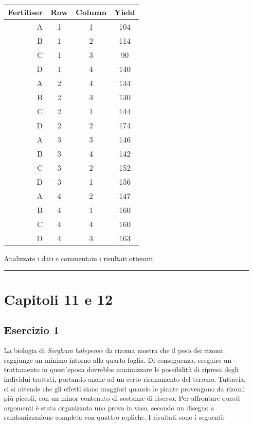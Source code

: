 \documentclass[a4paper,12pt,oneside]{book}
\begin{document}
\begin{longtable}[]{@{}rccc@{}}
\toprule
Fertiliser & Row & Column & Yield \\
\midrule
\endhead
A & 1 & 1 & 104 \\
B & 1 & 2 & 114 \\
C & 1 & 3 & 90 \\
D & 1 & 4 & 140 \\
A & 2 & 4 & 134 \\
B & 2 & 3 & 130 \\
C & 2 & 1 & 144 \\
D & 2 & 2 & 174 \\
A & 3 & 3 & 146 \\
B & 3 & 4 & 142 \\
C & 3 & 2 & 152 \\
D & 3 & 1 & 156 \\
A & 4 & 2 & 147 \\
B & 4 & 1 & 160 \\
C & 4 & 4 & 160 \\
D & 4 & 3 & 163 \\
\bottomrule
\end{longtable}

Analizzate i dati e commentate i risultati ottenuti

\begin{center}\rule{0.5\linewidth}{0.5pt}\end{center}

\hypertarget{capitoli-11-e-12}{%
\section{Capitoli 11 e 12}\label{capitoli-11-e-12}}

\hypertarget{esercizio-1-7}{%
\subsection{Esercizio 1}\label{esercizio-1-7}}

La biologia di \emph{Sorghum halepense} da rizoma mostra che il peso dei rizomi raggiunge un minimo intorno alla quarta foglia. Di conseguenza, eseguire un trattamento in quest'epoca dovrebbe minimizzare le possibilità di ripresa degli individui trattati, portando anche ad un certo risanamento del terreno. Tuttavia, ci si attende che gli effetti siano maggiori quando le piante provengono da rizomi più piccoli, con un minor contenuto di sostanze di riserva. Per affrontare questi argomenti è stata organizzata una prova in vaso, secondo un disegno a randomizzazione completa con quattro repliche. I risultati sono i seguenti:
\end{document}
